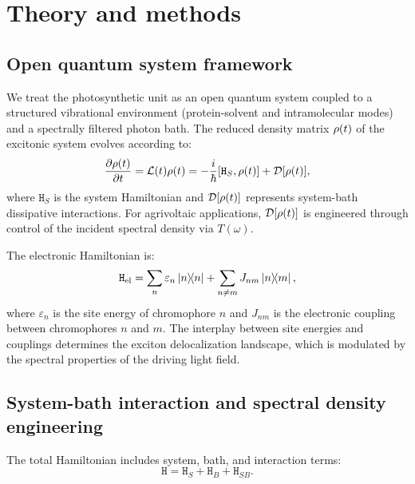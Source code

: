 
\section{Theory and methods}\label{sec:Theory}

\subsection{Open quantum system framework}

We treat the photosynthetic unit as an open quantum system coupled to a structured vibrational environment (protein-solvent and intramolecular modes) and a spectrally filtered photon bath. The reduced density matrix $\vb{\rho}(t)$ of the excitonic system evolves according to:
\begin{equation}\label{eq:master_eq}
\pdv{\vb{\rho}(t)}{t} = \mathcal{L}(t)\vb{\rho}(t) = -\frac{i}{\hbar}[\mathtt{H}_S, \vb{\rho}(t)] + \mathcal{D}[\vb{\rho}(t)],
\end{equation}
where $\mathtt{H}_S$ is the system Hamiltonian and $\mathcal{D}[\vb{\rho}(t)]$ represents system-bath dissipative interactions. For agrivoltaic applications, $\mathcal{D}[\vb{\rho}(t)]$ is engineered through control of the incident spectral density via $T(\omega)$.

The electronic Hamiltonian is:
\begin{equation}\label{eq:excitonic_hamiltonian}
\mathtt{H}_{\rm el} = \sum_n \varepsilon_n \dyad{n} + \sum_{n \neq m} J_{nm} \dyad{n}{m},
\end{equation}
where $\varepsilon_n$ is the site energy of chromophore $n$ and $J_{nm}$ is the electronic coupling between chromophores $n$ and $m$. The interplay between site energies and couplings determines the exciton delocalization landscape, which is modulated by the spectral properties of the driving light field.

\subsection{System-bath interaction and spectral density engineering}

The total Hamiltonian includes system, bath, and interaction terms:
\begin{equation}\label{eq:system_bath_hamiltonian}
\mathtt{H} = \mathtt{H}_S + \mathtt{H}_B + \mathtt{H}_{SB}.
\end{equation}

